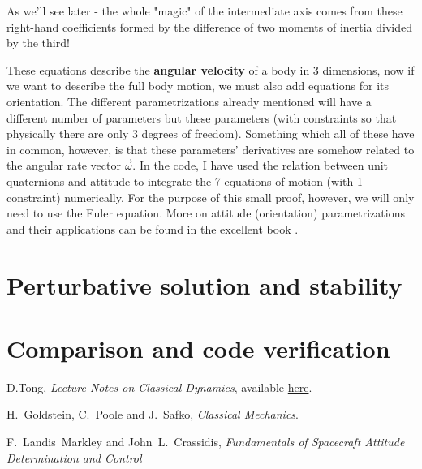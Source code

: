 \documentclass[a4paper]{article}
\begin{document}
	As we'll see later - the whole "magic" of the intermediate axis comes from these right-hand coefficients formed by the difference of two moments of inertia divided by the third!

	These equations describe the \textbf{angular velocity} of a body in 3 dimensions, now if we want to describe the full body motion, we must also add equations for its orientation.
	The different parametrizations already mentioned will have a different number of parameters but these parameters (with constraints so that physically there are only 3 degrees of freedom).
	Something which all of these have in common, however, is that these parameters' derivatives are somehow related to the angular rate vector $\vec{\omega}$.
	In the code, I have used the relation between unit quaternions and attitude to integrate the 7 equations of motion (with 1 constraint) numerically.
	For the purpose of this small proof, however, we will only need to use the Euler equation.
	More on attitude (orientation) parametrizations and their applications can be found in the excellent book \cite{ADCS_bible}.

	\section{Perturbative solution and stability}

	\section{Comparison and code verification}
	
	\begin{thebibliography}{9}

	D.Tong, \textit{Lecture Notes on Classical Dynamics}, available \href{http://www.damtp.cam.ac.uk/user/tong/dynamics/clas.pdf}{here}.

	H.~Goldstein, C.~Poole and J.~Safko, \textit{Classical Mechanics}.
	
	F.~Landis~Markley and John~L.~Crassidis, \textit{Fundamentals of Spacecraft Attitude Determination and Control}



	\end{thebibliography}
\end{document}
